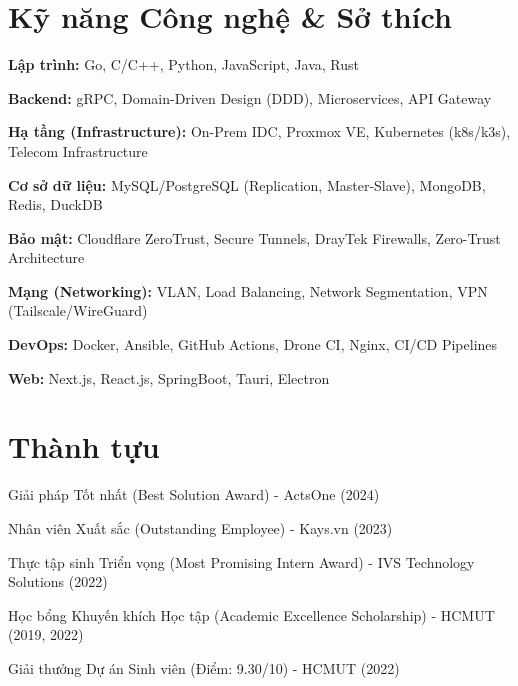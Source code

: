 \section{Kỹ năng Công nghệ \& Sở thích}
\begin{onecolentry}
\begin{highlights}
    \item \textbf{Lập trình:} Go, C/C++, Python, JavaScript, Java, Rust
    \item \textbf{Backend:} gRPC, Domain-Driven Design (DDD), Microservices, API Gateway
    \item \textbf{Hạ tầng (Infrastructure):} On-Prem IDC, Proxmox VE, Kubernetes (k8s/k3s), Telecom Infrastructure
    \item \textbf{Cơ sở dữ liệu:} MySQL/PostgreSQL (Replication, Master-Slave), MongoDB, Redis, DuckDB
    \item \textbf{Bảo mật:} Cloudflare ZeroTrust, Secure Tunnels, DrayTek Firewalls, Zero-Trust Architecture
    \item \textbf{Mạng (Networking):} VLAN, Load Balancing, Network Segmentation, VPN (Tailscale/WireGuard)
    \item \textbf{DevOps:} Docker, Ansible, GitHub Actions, Drone CI, Nginx, CI/CD Pipelines
    \item \textbf{Web:} Next.js, React.js, SpringBoot, Tauri, Electron
\end{highlights}
\end{onecolentry}

\section{Thành tựu}
\begin{onecolentry}
    \begin{highlights}
        \item Giải pháp Tốt nhất (Best Solution Award) - ActsOne (2024)
        \item Nhân viên Xuất sắc (Outstanding Employee) - Kays.vn (2023)
        \item Thực tập sinh Triển vọng (Most Promising Intern Award) - IVS Technology Solutions (2022)
        \item Học bổng Khuyến khích Học tập (Academic Excellence Scholarship) - HCMUT (2019, 2022)
        \item Giải thưởng Dự án Sinh viên (Điểm: 9.30/10) - HCMUT (2022)
    \end{highlights}
\end{onecolentry}
